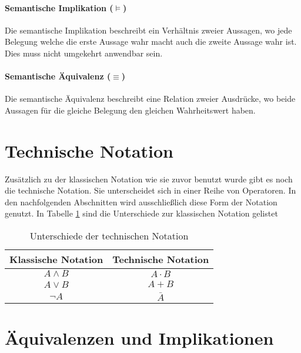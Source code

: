 \documentclass[../main.tex]{subfiles}
\begin{document}
        \paragraph{Semantische Implikation ($\models$)} Die semantische Implikation beschreibt ein Verhältnis zweier Aussagen, wo jede Belegung welche die erste Aussage wahr macht auch die zweite Aussage wahr ist. Dies muss nicht umgekehrt anwendbar sein.
        
        \paragraph{Semantische Äquivalenz ($\equiv$)} Die semantische Äquivalenz beschreibt eine Relation zweier Ausdrücke, wo beide Aussagen für die gleiche Belegung den gleichen Wahrheitswert haben.
                
    \section{Technische Notation}
        Zusätzlich zu der klassischen Notation wie sie zuvor benutzt wurde gibt es noch die technische Notation. Sie unterscheidet sich in einer Reihe von Operatoren. In den nachfolgenden Abschnitten wird ausschließlich diese Form der Notation genutzt. In Tabelle \ref{table:DiskreteMathematik:BoolscheAlgebra:TechnischeNotation} sind die Unterschiede zur klassischen Notation gelistet
        \begin{table}
            \centering
            \begin{tabular}{c c}
                Klassische Notation & Technische Notation\\
                \hline
                \noalign{\smallskip}
                $A \land B$ & $A \cdot B$ \\
                \noalign{\smallskip}
                $A \lor B$ & $A + B$ \\
                \noalign{\smallskip}
                $\lnot A$ & $\bar{A}$
            \end{tabular}
            \caption{Unterschiede der technischen Notation}
            \label{table:DiskreteMathematik:BoolscheAlgebra:TechnischeNotation}
        \end{table}
            
    \section{Äquivalenzen und Implikationen}
        
\end{document}
